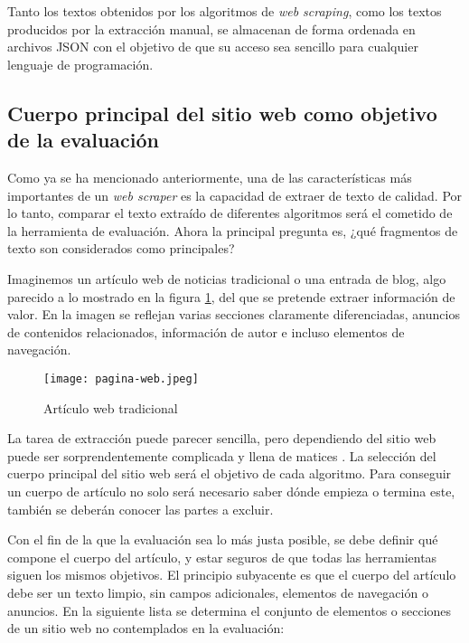Tanto los textos obtenidos por los algoritmos de \emph{web scraping}, como los textos producidos por la 
extracción manual, se almacenan de forma ordenada en archivos JSON con el objetivo de que su acceso sea 
sencillo para cualquier lenguaje de programación.

\subsection{Cuerpo principal del sitio web como objetivo de la evaluación}
\label{subsec:cuerpo principal del sitio web como objetivo de la evaluacion}

Como ya se ha mencionado anteriormente, una de las características más importantes de un \emph{web scraper}
es la capacidad de extraer de texto de calidad. Por lo tanto, comparar el texto extraído de diferentes
algoritmos será el cometido de la herramienta de evaluación. Ahora la principal pregunta es, ¿qué fragmentos
de texto son considerados como principales?

Imaginemos un artículo web de noticias tradicional o una entrada de blog, algo parecido a lo mostrado en
la figura \ref{img:articulo web tradicional}, del que se pretende extraer
información de valor. En la imagen se reflejan varias secciones claramente diferenciadas, anuncios de
contenidos relacionados, información de autor e incluso elementos de navegación.

\begin{figure}[tphb]
  \centering
  \texttt{[image: pagina-web.jpeg]}
  \caption{Artículo web tradicional}
  \label{img:articulo web tradicional}
\end{figure}

La tarea de extracción puede parecer sencilla, pero dependiendo del sitio web puede ser sorprendentemente
complicada y llena de matices \cite{boilerplate-removal}. La selección del cuerpo principal del sitio web 
será el objetivo de cada algoritmo. Para conseguir un cuerpo de artículo no solo será necesario saber dónde 
empieza o termina este, también se deberán conocer las partes a excluir. 

Con el fin de la que la evaluación sea lo más justa posible, se debe definir qué compone el cuerpo del
artículo, y estar seguros de que todas las herramientas siguen los mismos objetivos. El principio subyacente 
es que el cuerpo del artículo debe ser un texto limpio, sin campos adicionales, elementos de navegación o 
anuncios. En la siguiente lista se determina el conjunto de elementos o secciones de un sitio web no 
contemplados en la evaluación:

